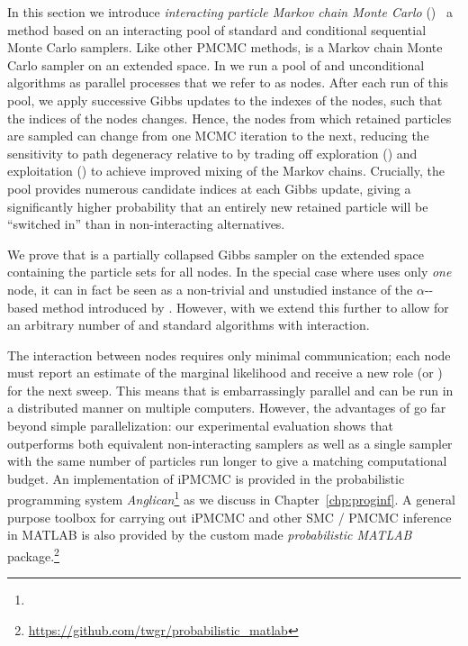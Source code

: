 

In this section we introduce \emph{interacting particle Markov chain Monte Carlo} (\ipmcmc)~\citep{rainforth2016interacting}
a \pmcmc method based on an interacting pool of standard and conditional sequential Monte Carlo samplers. Like 
other PMCMC methods, \ipmcmc is a Markov chain Monte Carlo sampler on an extended space. In \ipmcmc we run a pool of 
\csmc and unconditional \smc algorithms as parallel processes that we refer to as nodes. After each run of this pool, 
we apply successive Gibbs updates to the indexes of the \csmc nodes, such that the indices of the \csmc nodes changes. 
Hence, the nodes from which retained particles are sampled can change from one MCMC iteration to the next, reducing
the sensitivity to path degeneracy relative to \pg 
by trading off exploration (\smc) and exploitation (\csmc) to achieve improved mixing of the Markov chains. Crucially, 
the pool provides numerous candidate indices at each Gibbs update, giving a significantly higher probability that an 
entirely new retained particle will be ``switched in'' than in non-interacting alternatives.

We prove that \ipmcmc is a partially collapsed Gibbs sampler on the extended space containing the particle sets for all nodes. 
In the special case where \ipmcmc uses only \emph{one} \csmc node, it can in fact be seen as a non-trivial and unstudied 
instance of the $\alpha$-\smc-based \citep{whiteley2016} \pmcmc method introduced by \citet{huggins2015}. 
However, with \ipmcmc we extend this further to allow for an arbitrary number of \csmc and standard \smc algorithms 
with interaction.

The interaction between nodes requires only minimal communication; each node must report an estimate of the marginal likelihood 
and receive a new role (\smc or \csmc) for the next sweep. This means that \ipmcmc is embarrassingly parallel 
and can be run in a distributed manner on multiple computers.  However, the advantages of \ipmcmc go far beyond
simple parallelization: our experimental evaluation shows that \ipmcmc outperforms both equivalent
non-interacting \pmcmc samplers as well as a single \pg sampler with the same number of particles run longer
to give a matching computational budget.
An implementation of iPMCMC is provided in the probabilistic programming system
\emph{Anglican}\footnote{\angurl} \citep{wood2014new} as we discuss in Chapter~\ref{chp:proginf}.  A general 
purpose toolbox for carrying out iPMCMC and other SMC / PMCMC inference in MATLAB is also provided by the custom
made \emph{probabilistic MATLAB} package.\footnote{\url{https://github.com/twgr/probabilistic_matlab}}